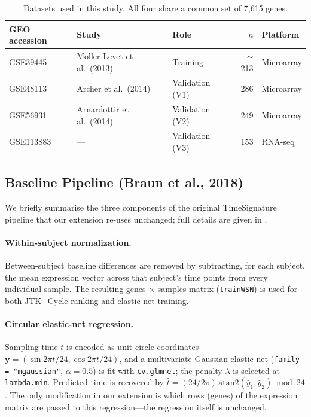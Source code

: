 \documentclass[10pt,a4paper]{article}
\begin{document}
\begin{table}[h]
\centering
\caption{Datasets used in this study.  All four share a common
set of 7,615 genes.}
\label{tab:datasets}
\begin{tabular}{lllrl}
\toprule
GEO accession & Study & Role & $n$ & Platform \\
\midrule
GSE39445  & Möller-Levet et al.\ (2013) & Training      & ${\sim}$213 & Microarray \\
GSE48113  & Archer et al.\ (2014)       & Validation (V1) & 286 & Microarray \\
GSE56931  & Arnardottir et al.\ (2014)  & Validation (V2) & 249 & Microarray \\
GSE113883 & ---                          & Validation (V3) & 153 & RNA-seq \\
\bottomrule
\end{tabular}
\end{table}
 
\subsection{Baseline Pipeline (Braun et al., 2018)}
 
We briefly summarise the three components of the original
TimeSignature pipeline that our extension re-uses unchanged; full
details are given in \citet{Braun2018}.
 
\paragraph{Within-subject normalization.}
Between-subject baseline differences are removed by subtracting, for
each subject, the mean expression vector across that subject's time
points from every individual sample.
The resulting genes $\times$ samples matrix (\texttt{trainWSN}) is
used for both JTK\_Cycle ranking and elastic-net training.
 
\paragraph{Circular elastic-net regression.}
Sampling time $t$ is encoded as unit-circle coordinates
$\mathbf{y} = (\sin 2\pi t/24,\allowbreak \cos 2\pi t/24)$, and a
multivariate Gaussian elastic net
(\texttt{family\,=\,"mgaussian"}, $\alpha = 0.5$) is fit with
\texttt{cv.glmnet}; the penalty $\lambda$ is selected at
\texttt{lambda.min}.
Predicted time is recovered by
$\hat t = (24/2\pi)\,\mathrm{atan2}(\hat y_1,\hat y_2) \bmod 24$.
The only modification in our extension is which rows (genes) of the
expression matrix are passed to this regression---the regression
itself is unchanged.
 
\end{document}
